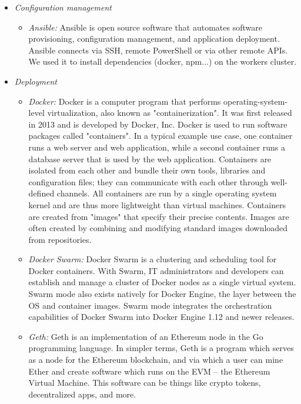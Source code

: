 \begin{itemize}
        \item \textit{Configuration management}
            \begin{itemize}
                \item \textit{Ansible: }
                Ansible is open source software that automates software provisioning, configuration management, and
                application deployment. Ansible connects via SSH, remote PowerShell or via other remote APIs.
                We used it to install dependencies (docker, npm...) on the workers cluster.
            \end{itemize}

        \item \textit{Deployment}
            \begin{itemize}
                \item \textit{Docker: }
                Docker is a computer program that performs operating-system-level virtualization,
                also known as "containerization". It was first released in 2013 and is developed by
                Docker, Inc. Docker is used to run software packages called "containers". In a typical
                example use case, one container runs a web server and web application, while a second
                container runs a database server that is used by the web application. Containers are
                isolated from each other and bundle their own tools, libraries and configuration files;
                they can communicate with each other through well-defined channels. All containers are
                run by a single operating system kernel and are thus more lightweight than virtual
                machines. Containers are created from "images" that specify their precise contents.
                Images are often created by combining and modifying standard images downloaded from
                repositories.
                \item \textit{Docker Swarm: }
                Docker Swarm is a clustering and scheduling tool for Docker containers. With Swarm, IT
                administrators and developers can establish and manage a cluster of Docker nodes as a single
                virtual system. Swarm mode also exists natively for Docker Engine, the layer between the OS
                and container images. Swarm mode integrates the orchestration capabilities of Docker Swarm
                into Docker Engine 1.12 and newer releases.
                \item \textit{Geth: }
                Geth is an implementation of an Ethereum node in the Go programming language. In simpler terms,
                Geth is a program which serves as a node for the Ethereum blockchain, and via which a user can
                mine Ether and create software which runs on the EVM – the Ethereum Virtual Machine.
                This software can be things like crypto tokens, decentralized apps, and more.
            \end{itemize}


\end{itemize}
